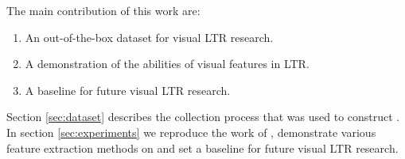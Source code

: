The main contribution of this work are:
\begin{enumerate}  
\item An out-of-the-box dataset for visual \ac{LTR} research.
\item A demonstration of the abilities of visual features in \ac{LTR}.
\item A baseline for future visual \ac{LTR} research.
\end{enumerate}

Section \ref{sec:dataset} describes the collection process that was used to construct \datasetname. In section \ref{sec:experiments} we reproduce the work of \citet{fan2017learning}, demonstrate various feature extraction methods on \datasetname and set a baseline for future visual \ac{LTR} research.  